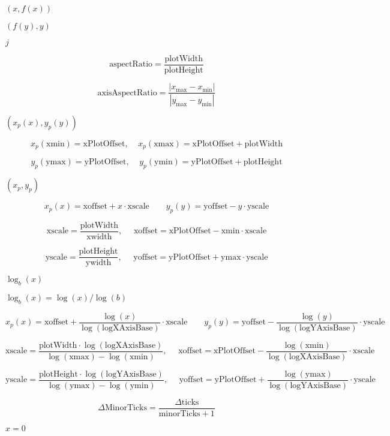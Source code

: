 \documentclass{article}
\begin{document}
$ \left(x, f(x) \right) $
\pagebreak

$ \left(f(y), y \right) $
\pagebreak

$ j $
\pagebreak

\[ \mbox{aspectRatio}=\frac{\mbox{plotWidth}}{\mbox{plotHeight}} \]
\pagebreak

\[ \mbox{axisAspectRatio}=\frac{\left|x_\text{max}-x_\text{min}\right|}{\left|y_\text{max}-y_\text{min}\right|} \]
\pagebreak

$ (x_p(x), y_p(y)) $
\pagebreak

\[ x_p(\mbox{xmin})=\mbox{xPlotOffset},\ \ \ \ \ x_p(\mbox{xmax})=\mbox{xPlotOffset}+\mbox{plotWidth} \]
\pagebreak

\[ y_p(\mbox{ymax})=\mbox{yPlotOffset},\ \ \ \ \ y_p(\mbox{ymin})=\mbox{yPlotOffset}+\mbox{plotHeight} \]
\pagebreak

$ (x_p, y_p) $
\pagebreak

\[ x_p(x)=\mbox{xoffset}+x\cdot\mbox{xscale} \ \ \ \ \ \ \ \ \ y_p(y)=\mbox{yoffset}-y\cdot\mbox{yscale} \]
\pagebreak

\[ \mbox{xscale}=\frac{\mbox{plotWidth}}{\mbox{xwidth}},\ \ \ \ \ \ \mbox{xoffset}=\mbox{xPlotOffset}-\mbox{xmin}\cdot\mbox{xscale} \]
\pagebreak

\[ \mbox{yscale}=\frac{\mbox{plotHeight}}{\mbox{ywidth}},\ \ \ \ \ \ \mbox{yoffset}=\mbox{yPlotOffset}+\mbox{ymax}\cdot\mbox{yscale} \]
\pagebreak

$ \log_b(x) $
\pagebreak

$ \log_b(x)=\log(x)/\log(b) $
\pagebreak

\[ x_p(x)=\mbox{xoffset}+\frac{\log(x)}{\log(\mbox{logXAxisBase})}\cdot\mbox{xscale} \ \ \ \ \ \ \ \ \ y_p(y)=\mbox{yoffset}-\frac{\log(y)}{\log(\mbox{logYAxisBase})}\cdot\mbox{yscale} \]
\pagebreak

\[ \mbox{xscale}=\frac{\mbox{plotWidth}\cdot\log(\mbox{logXAxisBase})}{\log(\mbox{xmax})-\log(\mbox{xmin})},\ \ \ \ \ \ \mbox{xoffset}=\mbox{xPlotOffset}-\frac{\log(\mbox{xmin})}{\log(\mbox{logXAxisBase})}\cdot\mbox{xscale} \]
\pagebreak

\[ \mbox{yscale}=\frac{\mbox{plotHeight}\cdot\log(\mbox{logYAxisBase})}{\log(\mbox{ymax})-\log(\mbox{ymin})},\ \ \ \ \ \ \mbox{yoffset}=\mbox{yPlotOffset}+\frac{\log(\mbox{ymax})}{\log(\mbox{logYAxisBase})}\cdot\mbox{yscale} \]
\pagebreak

\[ \Delta\mbox{MinorTicks}=\frac{\Delta\mbox{ticks}}{\mbox{minorTicks}+1} \]
\pagebreak

$ x=0 $
\pagebreak
\end{document}
